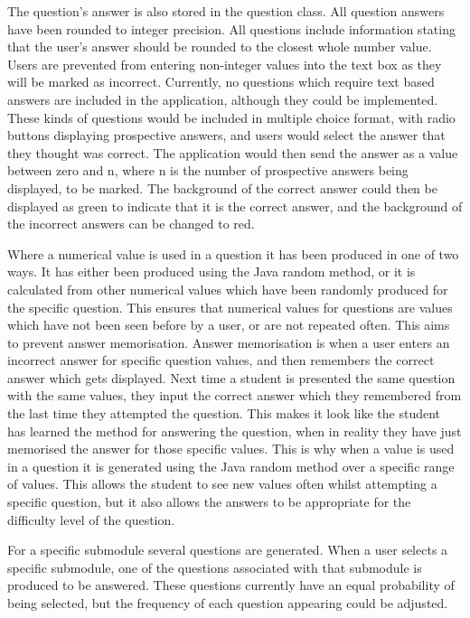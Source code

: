 \documentclass{article}
\begin{document}
The question's answer is also stored in the question class. All question answers have been rounded to integer precision. All questions include information stating that the user's answer should be rounded to the closest whole number value. Users are prevented from entering non-integer values into the text box as they will be marked as incorrect. Currently, no questions which require text based answers are included in the application, although they could be implemented. These kinds of questions would be included in multiple choice format, with radio buttons displaying prospective answers, and users would select the answer that they thought was correct. The application would then send the answer as a value between zero and n, where n is the number of prospective answers being displayed, to be marked. The background of the correct answer could then be displayed as green to indicate that it is the correct answer, and the background of the incorrect answers can be changed to red. \par

Where a numerical value is used in a question it has been produced in one of two ways. It has either been produced using the Java random method, or it is calculated from other numerical values which have been randomly produced for the specific question. This ensures that numerical values for questions are values which have not been seen before by a user, or are not repeated often. This aims to prevent answer memorisation. Answer memorisation is when a user enters an incorrect answer for specific question values, and then remembers the correct answer which gets displayed. Next time a student is presented the same question with the same values, they input the correct answer which they remembered from the last time they attempted the question. This makes it look like the student has learned the method for answering the question, when in reality they have just memorised the answer for those specific values. This is why when a value is used in a question it is generated using the Java random method over a specific range of values. This allows the student to see new values often whilst attempting a specific question, but it also allows the answers to be appropriate for the difficulty level of the question. \par

For a specific submodule several questions are generated. When a user selects a specific submodule, one of the questions associated with that submodule is produced to be answered. These questions currently have an equal probability of being selected, but the frequency of each question appearing could be adjusted. \par
\end{document}
